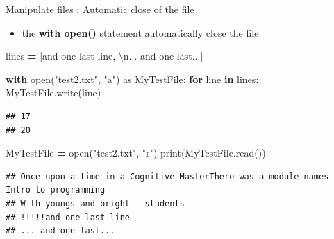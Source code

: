 \documentclass[
  8pt,
  ignorenonframetext,
]{beamer}
\newenvironment{Shaded}{\begin{snugshade}}{\end{snugshade}}
\newcommand{\BuiltInTok}[1]{#1}
\newcommand{\CharTok}[1]{\textcolor[rgb]{0.31,0.60,0.02}{#1}}
\newcommand{\ControlFlowTok}[1]{\textcolor[rgb]{0.13,0.29,0.53}{\textbf{#1}}}
\newcommand{\ImportTok}[1]{#1}
\newcommand{\KeywordTok}[1]{\textcolor[rgb]{0.13,0.29,0.53}{\textbf{#1}}}
\newcommand{\NormalTok}[1]{#1}
\newcommand{\OperatorTok}[1]{\textcolor[rgb]{0.81,0.36,0.00}{\textbf{#1}}}
\newcommand{\StringTok}[1]{\textcolor[rgb]{0.31,0.60,0.02}{#1}}
\providecommand{\tightlist}{%
  \setlength{\itemsep}{0pt}\setlength{\parskip}{0pt}}
\begin{document}
\begin{frame}[fragile]{Manipulate files : Automatic close of the file}
\protect\hypertarget{manipulate-files-automatic-close-of-the-file}{}
\begin{itemize}
\tightlist
\item
  the \textbf{with open()} statement automatically close the file
\end{itemize}

\begin{Shaded}
\begin{Highlighting}[]
\NormalTok{lines }\OperatorTok{=}\NormalTok{ [}\StringTok{\textquotesingle{}and one last line\textquotesingle{}}\NormalTok{, }\StringTok{\textquotesingle{}}\CharTok{\textbackslash{}n}\StringTok{... and one last...\textquotesingle{}}\NormalTok{]}

\ControlFlowTok{with} \BuiltInTok{open}\NormalTok{(}\StringTok{"test2.txt"}\NormalTok{, }\StringTok{"a"}\NormalTok{) }\ImportTok{as}\NormalTok{ MyTestFile:}
    \ControlFlowTok{for}\NormalTok{ line }\KeywordTok{in}\NormalTok{ lines: }
\NormalTok{      MyTestFile.write(line)}
\end{Highlighting}
\end{Shaded}

\begin{verbatim}
## 17
## 20
\end{verbatim}

\begin{Shaded}
\begin{Highlighting}[]
\NormalTok{MyTestFile }\OperatorTok{=} \BuiltInTok{open}\NormalTok{(}\StringTok{"test2.txt"}\NormalTok{, }\StringTok{"r"}\NormalTok{)}
\BuiltInTok{print}\NormalTok{(MyTestFile.read())}
\end{Highlighting}
\end{Shaded}

\begin{verbatim}
## Once upon a time in a Cognitive MasterThere was a module names Intro to programming
## With youngs and bright   students 
## !!!!!and one last line
## ... and one last...
\end{verbatim}
\end{frame}
\end{document}
